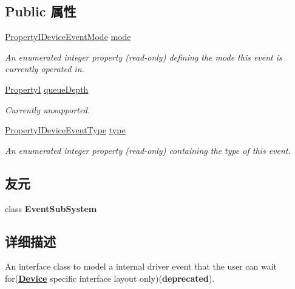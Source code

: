 \subsection*{Public 属性}
\begin{DoxyCompactItemize}
\item 
\hyperlink{group___device_specific_interface_ga703f3c4af8606165b832097144354c75}{Property\+I\+Device\+Event\+Mode} \hyperlink{classmv_i_m_p_a_c_t_1_1acquire_1_1_event_af129965537dfc66b9661538619872fd0}{mode}
\begin{DoxyCompactList}\small\item\em An enumerated integer property {\bfseries }(read-\/only) defining the mode this event is currently operated in. \end{DoxyCompactList}\item 
\hyperlink{group___common_interface_ga12d5e434238ca242a1ba4c6c3ea45780}{Property\+I} \hyperlink{classmv_i_m_p_a_c_t_1_1acquire_1_1_event_a1317c421236a92fc1aab555c53a40906}{queue\+Depth}
\begin{DoxyCompactList}\small\item\em Currently unsupported. \end{DoxyCompactList}\item 
\hyperlink{group___device_specific_interface_ga015a49062ba10316202f202c53d32993}{Property\+I\+Device\+Event\+Type} \hyperlink{classmv_i_m_p_a_c_t_1_1acquire_1_1_event_a0747b4aa5d3d5f0adcfedbc635aa5def}{type}
\begin{DoxyCompactList}\small\item\em An enumerated integer property {\bfseries }(read-\/only) containing the type of this event. \end{DoxyCompactList}\end{DoxyCompactItemize}
\subsection*{友元}
\begin{DoxyCompactItemize}
\item 
\hypertarget{classmv_i_m_p_a_c_t_1_1acquire_1_1_event_a4ef9fd83fedb038f6f0e423f575fd787}{class {\bfseries Event\+Sub\+System}}\label{classmv_i_m_p_a_c_t_1_1acquire_1_1_event_a4ef9fd83fedb038f6f0e423f575fd787}

\end{DoxyCompactItemize}


\subsection{详细描述}
An interface class to model a internal driver event that the user can wait for({\bfseries \hyperlink{classmv_i_m_p_a_c_t_1_1acquire_1_1_device}{Device}} specific interface layout only)({\bfseries deprecated}). 

